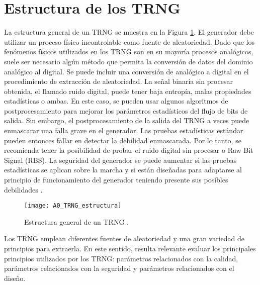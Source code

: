 	\section{Estructura de los TRNG}	

        La estructura general de un TRNG se muestra en la Figura \ref{fig:A1_TRNG_estructura}. El generador debe utilizar un proceso físico incontrolable como fuente de aleatoriedad. Dado que los fenómenos físicos utilizados en los TRNG son en su mayoría procesos analógicos, suele ser necesario algún método que permita la conversión de datos del dominio analógico al digital. Se puede incluir una conversión de analógico a digital en el procedimiento de extracción de aleatoriedad. La señal binaria sin procesar obtenida, el llamado ruido digital, puede tener baja entropía, malas propiedades estadísticas o ambas. En este caso, se pueden usar algunos algoritmos de postprocesamiento para mejorar los parámetros estadísticos del flujo de bits de salida. Sin embargo, el postprocesamiento de la salida del TRNG a veces puede enmascarar una falla grave en el generador. Las pruebas estadísticas estándar pueden entonces fallar en detectar la debilidad enmascarada. Por lo tanto, se recomienda tener la posibilidad de probar el ruido digital sin procesar o Raw Bit Signal (RBS). La seguridad del generador se puede aumentar si las pruebas estadísticas se aplican sobre la marcha y si están diseñadas para adaptarse al principio de funcionamiento del generador teniendo presente sus posibles debilidades \cite{Badrignans2011}.
			
        \begin{figure}[hbtp]
            \caption{Estructura general de un TRNG \cite{Badrignans2011}.}
            \centering
            \texttt{[image: A0\_TRNG\_estructura]}
            \label{fig:A1_TRNG_estructura}
        \end{figure}
	
        Los TRNG emplean diferentes fuentes de aleatoriedad y una gran variedad de principios para extraerla. En este sentido, resulta relevante evaluar los principales principios utilizados por los TRNG: parámetros relacionados con la calidad, parámetros relacionados con la seguridad y parámetros relacionados con el diseño.

